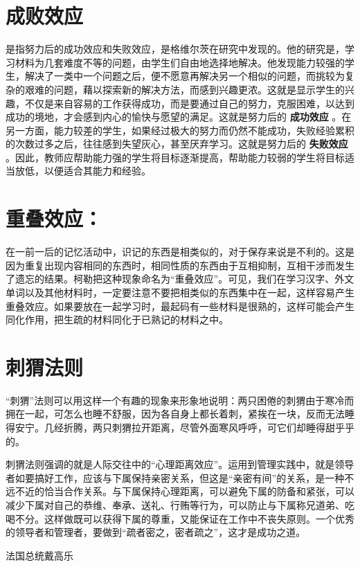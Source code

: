 \documentclass[11pt]{ctexart}
\begin{document}
\section{成败效应}
\label{sec-20}


是指努力后的成功效应和失败效应，是格维尔茨在研究中发现的。他的研究是，学习材料为几套难度不等的问题，由学生们自由地选择地解决。他发现能力较强的学生，解决了一类中一个问题之后，便不愿意再解决另一个相似的问题，而挑较为复杂的艰难的问题，藉以探索新的解决方法，而感到兴趣更浓。这就是显示学生的兴趣，不仅是来自容易的工作获得成功，而是要通过自己的努力，克服困难，以达到成功的境地，才会感到内心的愉快与愿望的满足。这就是努力后的 \textbf{成功效应} 。在另一方面，能力较差的学生，如果经过极大的努力而仍然不能成功，失败经验累积的次数过多之后，往往感到失望灰心，甚至厌弃学习。这就是努力后的 \textbf{失败效应} 。因此，教师应帮助能力强的学生将目标逐渐提高，帮助能力较弱的学生将目标适当放低，以便适合其能力和经验。
\section{重叠效应：}
\label{sec-21}


在一前一后的记忆活动中，识记的东西是相类似的，对于保存来说是不利的。这是因为重复出现内容相同的东西时，相同性质的东西由于互相抑制，互相干涉而发生了遗忘的结果。柯勒把这种现象命名为“重叠效应”。可见，我们在学习汉字、外文单词以及其他材料时，一定要注意不要把相类似的东西集中在一起，这样容易产生重叠效应。如果要放在一起学习时，最起码有一些材料是很熟的，这样可能会产生同化作用，把生疏的材料同化于已熟记的材料之中。
\section{刺猬法则}
\label{sec-22}


“刺猬”法则可以用这样一个有趣的现象来形象地说明：两只困倦的刺猬由于寒冷而拥在一起，可怎么也睡不舒服，因为各自身上都长着刺，紧挨在一块，反而无法睡得安宁。几经折腾，两只刺猬拉开距离，尽管外面寒风呼呼，可它们却睡得甜乎乎的。

刺猬法则强调的就是人际交往中的“心理距离效应”。运用到管理实践中，就是领导者如要搞好工作，应该与下属保持亲密关系，但这是“亲密有间”的关系，是一种不远不近的恰当合作关系。与下属保持心理距离，可以避免下属的防备和紧张，可以减少下属对自己的恭维、奉承、送礼、行贿等行为，可以防止与下属称兄道弟、吃喝不分。这样做既可以获得下属的尊重，又能保证在工作中不丧失原则。一个优秀的领导者和管理者，要做到“疏者密之，密者疏之”，这才是成功之道。

法国总统戴高乐
\end{document}
